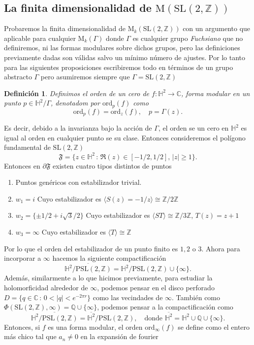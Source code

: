 \documentclass[letterpaper]{article}
\newtheorem{def.}{Definici\'on}[section]
\newcommand{\zah}{\ensuremath{ \mathbb Z }}
\newcommand{\rac}{\ensuremath{ \mathbb Q }}
\newcommand{\ga}{\ensuremath{\Gamma}}
\newcommand{\co}{\ensuremath{\mathbb C }}
\newcommand{\pslz}{\ensuremath{\mathrm{PSL}(2,\mathbb Z) }}
\newcommand{\hd}{\ensuremath{\mathbb H^2}}
\newcommand{\slz}{\ensuremath{\mathrm{SL}(2,\mathbb Z) }}
\newcommand{\mdlr}{\ensuremath{\mathrm{M}}}
\begin{document}
\subsection{La finita dimensionalidad de \(\mdlr(\slz)\)}
\noindent Probaremos la finita dimensionalidad de \(\mdlr_{k}(\slz)\) con un argumento que aplicable para cualquier \(\mdlr_{k}(\ga)\) donde \(\ga\) es cualquier grupo \emph{Fuchsiano} que no definiremos, ni las formas modulares sobre dichos grupos, pero las definiciones previamente dadas son válidas salvo un mínimo número de ajustes. Por lo tanto para las siguientes proposiciones escribiremos todo en términos de un grupo abstracto \(\ga\) pero asumiremos siempre que \(\ga=\slz\)
\begin{def.}
Definimos el orden de un cero de \(f:\hd\rightarrow\co\), forma modular en un punto \(p\in\hd/\ga\), denotadom por \(\mathrm{ord}_p(f)\) como
\[
 \mathrm{ord}_p(f)=\mathrm{ord}_z(f),\quad p=\ga(z).
\]
\end{def.}
Es decir, debido a la invarianza bajo la acción de \(\ga\), el orden se un cero en \(\hd\) es igual al orden en cualquier punto se su clase.
Entonces consideremos el polígono fundamental de \(\slz\)
\[
    \mathfrak{F}=\{z\in\hd\,:\, \Re(z)\in[-1/2,1/2],\,|z|\geq 1\}.
\]
\noindent Entonces en \(\partial\mathfrak{F}\) existen cuatro tipos distintos de puntos
\begin{enumerate}
\item Puntos genéricos con estabilizador trivial.
\item \(w_1=i\) Cuyo estabilizador es \(\langle S(z)=-1/z \rangle\cong\zah/2\zah\)
\item \(w_2=\{\pm 1/2+i\sqrt{3}/2\}\) Cuyo estabilizador es  \(\langle ST \rangle\cong\zah/3\zah\), \(T(z)=z+1\)
\item \(w_3=\infty\) Cuyo estabilizador es \(\langle T\rangle\cong\zah\)
\end{enumerate}
Por lo que el orden del estabilizador de un punto finito es \(1,2\) o \(3\). Ahora para incorporar a \(\infty\) hacemos la siguiente compactificación
\[
    \overline{\hd/\pslz}=\hd/\pslz\cup\{\infty\}.
\]
Además, similarmente a lo que hicimos previamente, para estudiar la holomorficidad alrededor de \(\infty\), podemos pensar en el disco perforado \(D=\{q\in\co\,:\,0<|q|<e^{-2\pi r}\}\) como las vecindades de \(\infty\). También como \(\Phi(\slz,\infty)=\rac\cup\{\infty\}\), podemos pensar a la compactificación como
\[
    \overline{\hd/\pslz}=\overline{\hd}/\pslz,\quad\text{donde }\overline{\hd}=\hd\cup\rac\cup\{\infty\}.
\]
Entonces, si \(f\) es una forma modular, el orden \(\mathrm{ord}_{\infty}(f)\) se define como el entero más chico tal que \(a_n\neq0\) en la expansión de fourier
\end{document}
